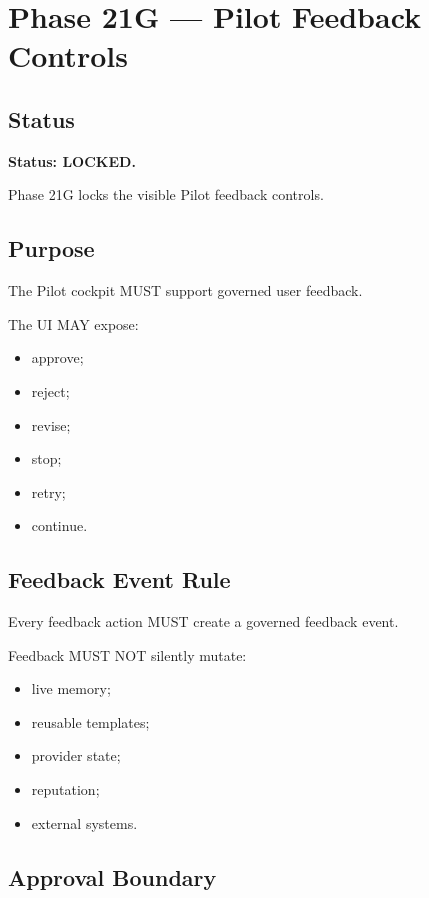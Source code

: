 \section{Phase 21G --- Pilot Feedback Controls}
\label{sec:aion-phase21g-pilot-feedback-controls}

\subsection{Status}

\textbf{Status: LOCKED.}

Phase 21G locks the visible Pilot feedback controls.

\subsection{Purpose}

The Pilot cockpit MUST support governed user feedback.

The UI MAY expose:

\begin{itemize}
  \item approve;
  \item reject;
  \item revise;
  \item stop;
  \item retry;
  \item continue.
\end{itemize}

\subsection{Feedback Event Rule}

Every feedback action MUST create a governed feedback event.

Feedback MUST NOT silently mutate:

\begin{itemize}
  \item live memory;
  \item reusable templates;
  \item provider state;
  \item reputation;
  \item external systems.
\end{itemize}

\subsection{Approval Boundary}

